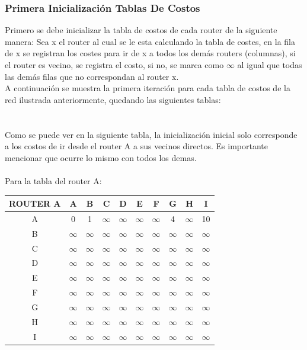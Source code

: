 \documentclass{article}
\begin{document}
\subsubsection*{Primera Inicialización Tablas De Costos}
Primero se debe inicializar la tabla de costos de cada router de la siguiente manera: Sea x el router al cual se le esta calculando la tabla de costes, en la fila de x se registran los costes para ir de x a todos los demás routers (columnas), si el router es vecino, se registra el costo, si no, se marca como $\infty$ al igual que todas las demás filas que no correspondan al router x.\\
A continuación se muestra la primera iteración para cada tabla de costos de la red ilustrada anteriormente, quedando las siguientes tablas:\\
\\\\
Como se puede ver en la siguiente tabla, la inicialización inicial solo corresponde a los costos de ir desde el router A a sus vecinos directos. Es importante mencionar que ocurre lo mismo con todos los demas.\\\\

Para la tabla del router A:\\
\begin{tabular}{ | c | c | c | c | c | c | c | c | c | c |}
\hline                    
ROUTER A    & A      & B      & C      & D      & E      & F      & G      & H      & I      \\
\hline
        A   & 0      & 1      &$\infty$&$\infty$&$\infty$&$\infty$& 4      &$\infty$& 10     \\
\hline
        B   &$\infty$&$\infty$&$\infty$&$\infty$&$\infty$&$\infty$&$\infty$&$\infty$&$\infty$\\
\hline
        C   &$\infty$&$\infty$&$\infty$&$\infty$&$\infty$&$\infty$&$\infty$&$\infty$&$\infty$\\
\hline
        D   &$\infty$&$\infty$&$\infty$&$\infty$&$\infty$&$\infty$&$\infty$&$\infty$&$\infty$\\
\hline
        E   &$\infty$&$\infty$&$\infty$&$\infty$&$\infty$&$\infty$&$\infty$&$\infty$&$\infty$\\
\hline
        F   &$\infty$&$\infty$&$\infty$&$\infty$&$\infty$&$\infty$&$\infty$&$\infty$&$\infty$\\
\hline
        G   &$\infty$&$\infty$&$\infty$&$\infty$&$\infty$&$\infty$&$\infty$&$\infty$&$\infty$\\
\hline
        H   &$\infty$&$\infty$&$\infty$&$\infty$&$\infty$&$\infty$&$\infty$&$\infty$&$\infty$\\
\hline 
        I   &$\infty$&$\infty$&$\infty$&$\infty$&$\infty$&$\infty$&$\infty$&$\infty$&$\infty$\\
\hline
\end{tabular}
\\\\
\end{document}
